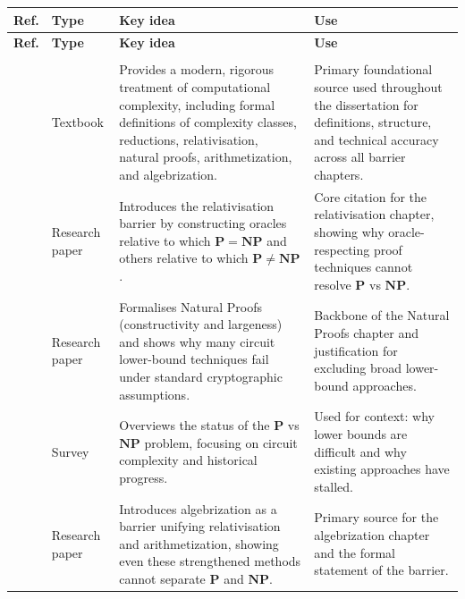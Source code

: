 \documentclass[12pt]{report}
\begin{document}
{
\setlength{\tabcolsep}{5pt}
\renewcommand{\arraystretch}{1.2}

\begin{longtable}{|
  >{\raggedright\arraybackslash}p{}|
  >{\raggedright\arraybackslash}p{}|
  >{\raggedright\arraybackslash}p{}|
  >{\raggedright\arraybackslash}p{}|
}
\hline
\textbf{Ref.} & \textbf{Type} & \textbf{Key idea} & \textbf{Use} \\
\hline
\endfirsthead

\hline
\textbf{Ref.} & \textbf{Type} & \textbf{Key idea} & \textbf{Use} \\
\hline
\endhead

\hline
\multicolumn{4}{r}{\small\textit{Continued on next page}} \\
\endfoot

\hline
\endlastfoot

\cite{arora2009} &
Textbook &
Provides a modern, rigorous treatment of computational complexity, including formal definitions of complexity classes, reductions, relativisation, natural proofs, arithmetization, and algebrization. &
Primary foundational source used throughout the dissertation for definitions, structure, and technical accuracy across all barrier chapters. \\
\hline

\cite{baker1975relativizations} &
Research paper &
Introduces the relativisation barrier by constructing oracles relative to which $\mathbf{P = NP}$ and others relative to which $\mathbf{P \neq NP}$. &
Core citation for the relativisation chapter, showing why oracle-respecting proof techniques cannot resolve $\mathbf{P}$ vs $\mathbf{NP}$. \\
\hline

\cite{razborov1994} &
Research paper &
Formalises Natural Proofs (constructivity and largeness) and shows why many circuit lower-bound techniques fail under standard cryptographic assumptions. &
Backbone of the Natural Proofs chapter and justification for excluding broad lower-bound approaches. \\
\hline

\cite{fortnow2009status} &
Survey &
Overviews the status of the $\mathbf{P}$ vs $\mathbf{NP}$ problem, focusing on circuit complexity and historical progress. &
Used for context: why lower bounds are difficult and why existing approaches have stalled. \\
\hline

\cite{arora2008algebrization} &
Research paper &
Introduces algebrization as a barrier unifying relativisation and arithmetization, showing even these strengthened methods cannot separate $\mathbf{P}$ and $\mathbf{NP}$. &
Primary source for the algebrization chapter and the formal statement of the barrier. \\
\hline


\end{longtable}}
\end{document}
